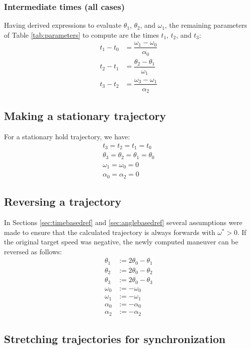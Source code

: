 \documentclass[12pt, a4paper]
{article}
\providecommand{\w}{\omega}
\providecommand{\wt}{\w^*}
\renewcommand{\th}{\theta}
\renewcommand{\a}{\alpha}
\begin{document}
\subsubsection{Intermediate times (all cases)}

Having derived expressions to evaluate $\th_1$, $\th_2$, and $\w_1$, the
remaining parameters of Table \ref{tab:parameters} to compute are the times
$t_1$, $t_2$, and $t_3$:
%
\begin{align}
    t_1 - t_0 &= \dfrac{\w_1-\w_0}{\a_0}\\[1em]
    t_2 - t_1 &= \dfrac{\th_2-\th_1}{\w_1}\\[1em]
    t_3 - t_2 &= \dfrac{\w_3-\w_1}{\a_2}
\end{align}

\subsection{Making a stationary trajectory}
\label{sec:stationary}
For a stationary hold trajectory, we have:
%
\begin{align}
    t_3 = t_2 = t_1 = t_0 \\[1em]
    \th_3 = \th_2 = \th_1 = \th_0 \\[1em]
    \w_1 = \w_0 = 0 \\[1em]
    \a_0 = \a_2 = 0
\end{align}


\subsection{Reversing a trajectory}
\label{sec:invert}
In Sections \ref{sec:timebasedref} and \ref{sec:anglebasedref} several
assumptions were made to ensure that the calculated trajectory is always
forwards with $\wt > 0$. If the original target speed was negative, the
newly computed maneuver can be reversed as follows:
%
\begin{align}
    \th_1 &:= 2 \th_0 - \th_1\\[1em]
    \th_2 &:= 2 \th_0 - \th_2\\[1em]
    \th_3 &:= 2 \th_0 - \th_3\\[1em]
    \w_0 &:= -\w_0\\[1em]
    \w_1 &:= -\w_1\\[1em]
    \a_0 &:= -\a_0\\[1em]
    \a_2 &:= -\a_2
\end{align}

\subsection{Stretching trajectories for synchronization}
\end{document}
